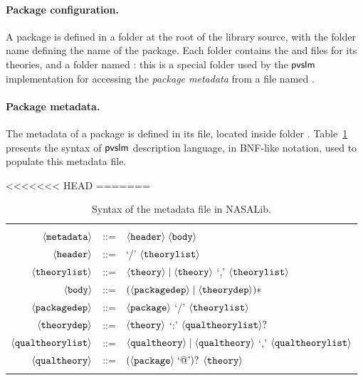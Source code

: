 \paragraph{Package configuration.}
A package is defined in a folder at the root of the library source,
with the folder name defining the name of the package. Each folder
contains the  and  files for its theories, and a
folder named : this is a special folder used by the
$\textsf{pvslm}$ implementation for accessing the {\em package metadata} from
a file named .

\paragraph{Package metadata.} The metadata of a package is defined
in its  file, located inside folder
. Table~\ref{tab.bnf} presents the syntax of $\textsf{pvslm}$
description language, in BNF-like notation, used to populate this
metadata file.

<<<<<<< HEAD
=======
\begin{table}
  \centering
  \begin{tabular}{r c p{8cm}}
    \hline \\
    $\langle{\texttt{metadata}}\rangle$ & ::= & $\langle{\texttt{header}}\rangle \; \langle{\texttt{body}}\rangle$ \\
    $\langle{\texttt{header}}\rangle$ & ::= & `/' $\langle{\texttt{theorylist}}\rangle$ \\
    $\langle{\texttt{theorylist}}\rangle$ & ::= & $\langle{\texttt{theory}}\rangle \mid \langle{\texttt{theory}}\rangle$ `,' $\langle{\texttt{theorylist}}\rangle$ \\
    $\langle{\texttt{body}}\rangle$ & ::= & $(\langle{\texttt{packagedep}}\rangle \mid \langle{\texttt{theorydep}}\rangle)*$ \\
    $\langle{\texttt{packagedep}}\rangle$ & ::= & $\langle{\texttt{package}}\rangle$ `/' $\langle{\texttt{theorylist}}\rangle$ \\
    $\langle{\texttt{theorydep}}\rangle$ & ::= & $\langle{\texttt{theory}}\rangle$ `:' $\langle{\texttt{qualtheorylist}}\rangle ?$ \\
    $\langle{\texttt{qualtheorylist}}\rangle$ & ::= & $\langle{\texttt{qualtheory}}\rangle \mid \langle{\texttt{qualtheory}}\rangle$ `,' $\langle{\texttt{qualtheorylist}}\rangle$ \\
    $\langle{\texttt{qualtheory}}\rangle$ & ::= & $(\langle{\texttt{package}}\rangle\; \text{`@'})?$ $\langle{\texttt{theory}}\rangle$ \\
    \\
    \hline
  \end{tabular}
  \caption{Syntax of the  metadata file in NASALib.}
  \label{tab.bnf}
\end{table}

